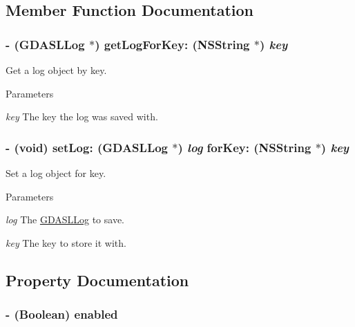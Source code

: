 \subsection{Member Function Documentation}
\hypertarget{interface_g_d_a_s_l_log_manager_ab8b36b60188da8c5faa9bfaccbeeafae}{
\subsubsection[{getLogForKey:}]{\setlength{\rightskip}{0pt plus 5cm}-\/ ({\bf GDASLLog} $\ast$) getLogForKey: (NSString $\ast$) {\em key}}}
\label{interface_g_d_a_s_l_log_manager_ab8b36b60188da8c5faa9bfaccbeeafae}


Get a log object by key. 
\begin{DoxyParams}{Parameters}
\item[{\em key}]The key the log was saved with. \end{DoxyParams}
\hypertarget{interface_g_d_a_s_l_log_manager_a8c4c1b87584a9091f02c263ef2396937}{
\subsubsection[{setLog:forKey:}]{\setlength{\rightskip}{0pt plus 5cm}-\/ (void) setLog: ({\bf GDASLLog} $\ast$) {\em log}\/ forKey: (NSString $\ast$) {\em key}}}
\label{interface_g_d_a_s_l_log_manager_a8c4c1b87584a9091f02c263ef2396937}


Set a log object for key. 
\begin{DoxyParams}{Parameters}
\item[{\em log}]The \hyperlink{interface_g_d_a_s_l_log}{GDASLLog} to save. \item[{\em key}]The key to store it with. \end{DoxyParams}


\subsection{Property Documentation}
\hypertarget{interface_g_d_a_s_l_log_manager_ad294e2a3caeb036f104d65b4c477820a}{
\subsubsection[{enabled}]{\setlength{\rightskip}{0pt plus 5cm}-\/ (Boolean) enabled}}
\label{interface_g_d_a_s_l_log_manager_ad294e2a3caeb036f104d65b4c477820a}


